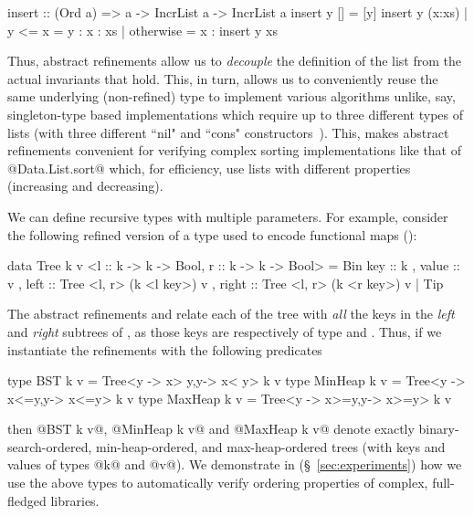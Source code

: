 {{{{\begin{code}
  insert :: (Ord a) => a -> IncrList a -> IncrList a 
  insert y []       = [y]
  insert y (x:xs) 
    | y <= x        = y : x : xs
    | otherwise     = x : insert y xs
\end{code}
%
%
%
%
Thus, abstract refinements allow us to \emph{decouple} the definition 
of the list from the actual invariants that hold.
This, in turn, allows us to conveniently reuse the same 
underlying (non-refined) type to implement various algorithms 
unlike, say, singleton-type based implementations which require 
up to three different types of lists (with three different ``nil" and ``cons" 
constructors~\cite{Sheard06}). This, makes abstract refinements 
convenient for verifying complex sorting implementations like that of 
@Data.List.sort@ which, for efficiency, use lists with different 
properties (\eg increasing and decreasing).

We can define recursive types with multiple parameters. 
For example, consider the following refined version of a type used 
to encode functional maps ():
%
\begin{code}
  data Tree k v <l :: k -> k -> Bool, r :: k -> k -> Bool>
    = Bin { key   :: k
          , value :: v 
          , left  :: Tree <l, r> (k <l key>) v 
          , right :: Tree <l, r> (k <r key>) v }
    | Tip
\end{code}
%
The abstract refinements  and  relate each 
of the tree with \emph{all} the keys in the \emph{left} and \emph{right}
subtrees of , as those keys are respectively of type 
 and .
%
Thus, if we instantiate the refinements with the following predicates
\begin{code}
  type BST k v     = Tree<{\x y -> x> y},{\x y-> x< y}> k v
  type MinHeap k v = Tree<{\x y -> x<=y},{\x y-> x<=y}> k v
  type MaxHeap k v = Tree<{\x y -> x>=y},{\x y-> x>=y}> k v
\end{code}
then @BST k v@, @MinHeap k v@ and @MaxHeap k v@ 
denote exactly binary-search-ordered, min-heap-ordered, and
max-heap-ordered trees (with keys and values of types @k@ and
@v@).  
%
We demonstrate in (\S~\ref{sec:experiments}) how we use the above types to 
automatically verify ordering properties of complex, full-fledged libraries.

}}}}
